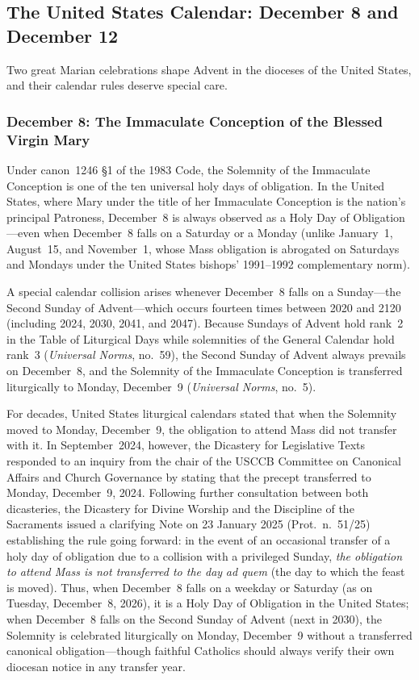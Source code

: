 \subsection{The United States Calendar: December 8 and December 12}

Two great Marian celebrations shape Advent in the dioceses of the United States, and their calendar rules deserve special care.

\subsubsection{December 8: The Immaculate Conception of the Blessed Virgin Mary}

Under canon~1246 \S1 of the 1983 Code, the Solemnity of the Immaculate Conception is one of the ten universal holy days of obligation. In the United States, where Mary under the title of her Immaculate Conception is the nation's principal Patroness, December~8 is always observed as a Holy Day of Obligation---even when December~8 falls on a Saturday or a Monday (unlike January~1, August~15, and November~1, whose Mass obligation is abrogated on Saturdays and Mondays under the United States bishops' 1991--1992 complementary norm).

A special calendar collision arises whenever December~8 falls on a Sunday---the Second Sunday of Advent---which occurs fourteen times between 2020 and 2120 (including 2024, 2030, 2041, and 2047). Because Sundays of Advent hold rank~2 in the Table of Liturgical Days while solemnities of the General Calendar hold rank~3 (\textit{Universal Norms}, no.~59), the Second Sunday of Advent always prevails on December~8, and the Solemnity of the Immaculate Conception is transferred liturgically to Monday, December~9 (\textit{Universal Norms}, no.~5).

For decades, United States liturgical calendars stated that when the Solemnity moved to Monday, December~9, the obligation to attend Mass did not transfer with it. In September~2024, however, the Dicastery for Legislative Texts responded to an inquiry from the chair of the USCCB Committee on Canonical Affairs and Church Governance by stating that the precept transferred to Monday, December~9, 2024. Following further consultation between both dicasteries, the Dicastery for Divine Worship and the Discipline of the Sacraments issued a clarifying Note on 23 January 2025 (Prot.~n.~51/25) establishing the rule going forward: in the event of an occasional transfer of a holy day of obligation due to a collision with a privileged Sunday, \textit{the obligation to attend Mass is not transferred to the day} \textit{ad quem} (the day to which the feast is moved). Thus, when December~8 falls on a weekday or Saturday (as on Tuesday, December~8, 2026), it is a Holy Day of Obligation in the United States; when December~8 falls on the Second Sunday of Advent (next in 2030), the Solemnity is celebrated liturgically on Monday, December~9 without a transferred canonical obligation---though faithful Catholics should always verify their own diocesan notice in any transfer year.

